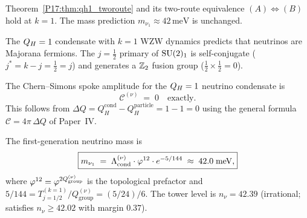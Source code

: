 \begin{corollary}[Two-route equivalence holds at $k=1$]
\label{P17:cor:two_route_k1}
Theorem~\ref{P17:thm:qh1_tworoute} and its two-route equivalence
$(A)\Leftrightarrow(B)$ hold at $k=1$. The mass prediction
$m_{\nu_1}\approx42\,\mathrm{meV}$ is unchanged.
\end{corollary}

\begin{corollary}
\label{P17:cor:majorana}
The $\QH=1$ condensate with $k=1$ WZW dynamics predicts that
neutrinos are Majorana fermions. The $j=\tfrac12$ primary of
$\mathrm{SU}(2)_1$ is self-conjugate ($j^* = k-j = \tfrac12 = j$) and
generates a $\mathbb{Z}_2$ fusion group ($\tfrac12\times\tfrac12=0$).
\end{corollary}

\begin{proposition}[Chern--Simons spoke amplitude for $\QH=1$: exact zero]
\label{P17:prop:CS_spoke}
The Chern--Simons spoke amplitude for the $\QH=1$ neutrino condensate is
\begin{equation}
  \mathcal{C}^{(\nu)} \;=\; 0 \quad \text{exactly.}
\end{equation}
This follows from $\Delta Q = Q_H^{\mathrm{cond}}-Q_H^{\mathrm{particle}}=1-1=0$
using the general formula $\mathcal{C}=4\pi\,\Delta Q$ of Paper~IV.
\end{proposition}

\begin{corollary}[$c=1$ mass formula and tower level]
\label{P17:cor:qh1_mass}
The first-generation neutrino mass is
\begin{equation}
  \boxed{m_{\nu_1}
  \;=\; \Lambda_{\mathrm{cond}}^{(\nu)}\cdot\varphi^{12}\cdot e^{-5/144}
  \;\approx\; 42.0\;\mathrm{meV},}
  \label{P17:eq:mnu1_final}
\end{equation}
where $\varphi^{12}=\varphi^{2Q_{\mathrm{group}}^{(\nu)}}$ is the topological
prefactor and $5/144=T_{j=1/2}^{(k=1)}/Q_{\mathrm{group}}^{(\nu)}=(5/24)/6$.
The tower level is $n_\nu=42.39$ (irrational; satisfies $n_\nu\geq42.02$
with margin $0.37$).
\end{corollary}

